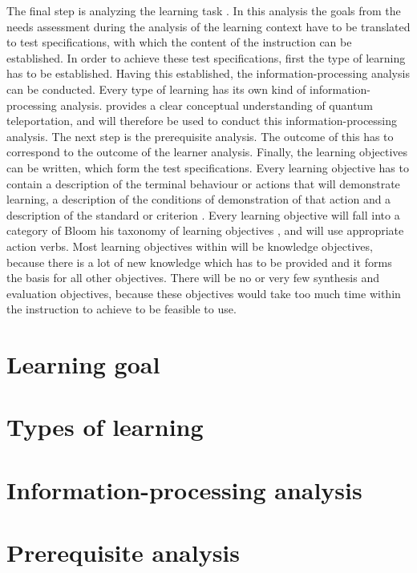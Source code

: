 \documentclass[12pt]{report} %
\begin{document}
The final step is analyzing the learning task \cite{smithragan}. In this analysis the goals from the needs assessment during the analysis of the learning context have to be translated to test specifications, with which the content of the instruction can be established. In order to achieve these test specifications, first the type of learning has to be established. Having this established, the information-processing analysis can be conducted. Every type of learning has its own kind of information-processing analysis.  provides a clear conceptual understanding of quantum teleportation, and will therefore be used to conduct this information-processing analysis. The next step is the prerequisite analysis. The outcome of this has to correspond to the outcome of the learner analysis. Finally, the learning objectives can be written, which form the test specifications. Every learning objective has to contain a description of the terminal behaviour or actions that will demonstrate learning, a description of the conditions of demonstration of that action and a description of the standard or criterion \cite{smithragan}. Every learning objective will fall into a category of Bloom his taxonomy of learning objectives \cite{bloom}, and will use appropriate action verbs. Most learning objectives within will be knowledge objectives, because there is a lot of new knowledge which has to be provided and it forms the basis for all other objectives. There will be no or very few synthesis and evaluation objectives, because these objectives would take too much time within the instruction to achieve to be feasible to use.

\section{Learning goal}

\section{Types of learning}

\section{Information-processing analysis}

\section{Prerequisite analysis}
\end{document}
